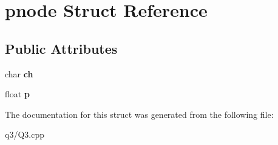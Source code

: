 \hypertarget{structpnode}{}\section{pnode Struct Reference}
\label{structpnode}
\subsection*{Public Attributes}
\begin{DoxyCompactItemize}
\item 
\mbox{\label{structpnode_a3fcffcc808c3272a4b76793562b9d3f1}} 
char {\bfseries ch}
\item 
\mbox{\label{structpnode_a404ac0245524d4d03ceab9b30bea8ae0}} 
float {\bfseries p}
\end{DoxyCompactItemize}


The documentation for this struct was generated from the following file\+:\begin{DoxyCompactItemize}
\item 
q3/Q3.\+cpp\end{DoxyCompactItemize}

